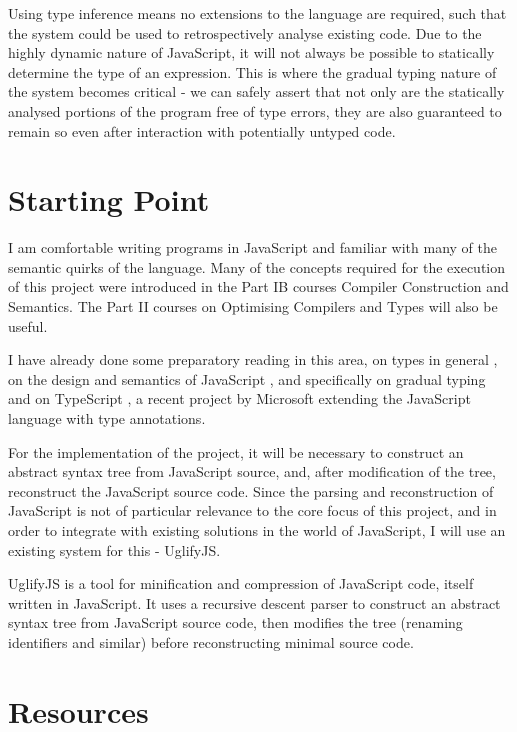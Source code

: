 \documentclass{article}
\begin{document}
		Using type inference means no extensions to the language are required,
		such that the system could be used to retrospectively analyse existing
		code. Due to the highly dynamic nature of JavaScript, it will not
		always be possible to statically determine the type of an expression.
		This is where the gradual typing nature of the system becomes critical
		- we can safely assert that not only are the statically analysed
		portions of the program free of type errors, they are also guaranteed
		to remain so even after interaction with potentially untyped code.

	\section{Starting Point}\label{prop-starting-point}

		I am comfortable writing programs in JavaScript and familiar with many
		of the semantic quirks of the language. Many of the concepts required
		for the execution of this project were introduced in the Part IB
		courses Compiler Construction and Semantics. The Part II courses on
		Optimising Compilers and Types will also be useful.

		I have already done some preparatory reading in this area, on types in
		general \cite{types1}, on the design and semantics of JavaScript
		\cite{js1,js2}, and specifically on gradual typing
		\cite{gradual1,gradual2} and on TypeScript \cite{typescript}, a recent
		project by Microsoft extending the JavaScript language with type
		annotations.

		For the implementation of the project, it will be necessary to
		construct an abstract syntax tree from JavaScript source, and, after
		modification of the tree, reconstruct the JavaScript source code. Since
		the parsing and reconstruction of JavaScript is not of particular
		relevance to the core focus of this project, and in order to integrate
		with existing solutions in the world of JavaScript, I will use an
		existing system for this - UglifyJS.

		UglifyJS is a tool for minification and compression of JavaScript code,
		itself written in JavaScript. It uses a recursive descent parser to
		construct an abstract syntax tree from JavaScript source code, then
		modifies the tree (renaming identifiers and similar) before
		reconstructing minimal source code.

	\section{Resources}\label{prop-resources}
\end{document}
